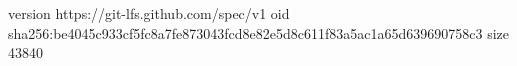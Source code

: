 version https://git-lfs.github.com/spec/v1
oid sha256:be4045c933cf5fc8a7fe873043fcd8e82e5d8c611f83a5ac1a65d639690758c3
size 43840
